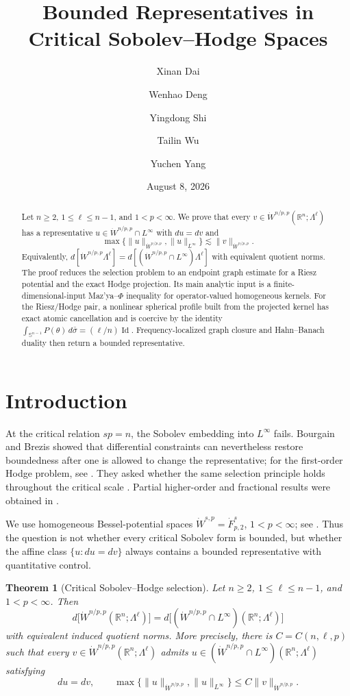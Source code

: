 \documentclass[11pt]{amsart}
\title{Bounded Representatives in Critical Sobolev--Hodge Spaces}
\author{Xinan Dai}
\author{Wenhao Deng}
\author{Yingdong Shi}
\author{Tailin Wu}
\author{Yuchen Yang}
\date{August 8, 2026}
\numberwithin{equation}{section}
\newtheorem{theorem}{Theorem}[section]
\theoremstyle{definition}
\theoremstyle{remark}
\newcommand{\R}{\mathbb R}
\newcommand{\Sph}{\mathbb S}
\newcommand{\Id}{\operatorname{Id}}
\newcommand{\norm}[1]{\lVert #1\rVert}
\begin{document}
\begin{abstract}
Let $n\ge2$, $1\le \ell\le n-1$, and $1<p<\infty$.  We prove that every
$v\in\dot W^{n/p,p}(\R^n;\Lambda^\ell)$ has a representative
$u\in\dot W^{n/p,p}\cap L^\infty$ with $du=dv$ and
\[
 \max\{\norm u_{\dot W^{n/p,p}},\norm u_{L^\infty}\}
 \lesssim \norm v_{\dot W^{n/p,p}}.
\]
Equivalently,
$d[\dot W^{n/p,p}\Lambda^\ell]
=d[(\dot W^{n/p,p}\cap L^\infty)\Lambda^\ell]$
with equivalent quotient norms.  The proof reduces the selection problem to
an endpoint graph estimate for a Riesz potential and the exact Hodge
projection.  Its main analytic input is a finite-dimensional-input
Maz'ya--$\Phi$ inequality for operator-valued homogeneous kernels.  For the
Riesz/Hodge pair, a nonlinear spherical profile built from the projected
kernel has exact atomic cancellation and is coercive by the identity
$\int_{\Sph^{n-1}}P(\theta)\,d\bar\sigma=(\ell/n)\Id$.  Frequency-localized
graph closure and Hahn--Banach duality then return a bounded representative.
\end{abstract}

\maketitle

\section{Introduction}

At the critical relation $sp=n$, the Sobolev embedding into $L^\infty$
fails.  Bourgain and Brezis showed that differential constraints can
nevertheless restore boundedness after one is allowed to change the
representative; for the first-order Hodge problem, see
\cite{BB03,BB04,BB07}.  They asked whether the same selection principle holds
throughout the critical scale \cite[p.~297, Open Problem~2]{BB07}.  Partial
higher-order and fractional results were obtained in \cite{BRWY19}.

We use homogeneous Bessel-potential spaces
$\dot W^{s,p}=\dot F^s_{p,2}$, $1<p<\infty$; see
\cite[Chapter~2]{Triebel83}.  Thus the question is not whether every critical
Sobolev form is bounded, but whether the affine class
$\{u:du=dv\}$ always contains a bounded representative with quantitative
control.

\begin{theorem}[Critical Sobolev--Hodge selection]\label{thm:main}
Let $n\ge2$, $1\le \ell\le n-1$, and $1<p<\infty$.  Then
\begin{equation}\label{eq:main-image}
 d\bigl[\dot W^{n/p,p}(\R^n;\Lambda^\ell)\bigr]
 =d\bigl[(\dot W^{n/p,p}\cap L^\infty)(\R^n;\Lambda^\ell)\bigr]
\end{equation}
with equivalent induced quotient norms.  More precisely, there is
$C=C(n,\ell,p)$ such that every
$v\in\dot W^{n/p,p}(\R^n;\Lambda^\ell)$ admits
$u\in(\dot W^{n/p,p}\cap L^\infty)(\R^n;\Lambda^\ell)$ satisfying
\begin{equation}\label{eq:main-estimate}
 du=dv,\qquad
 \max\bigl\{\norm{u}_{\dot W^{n/p,p}},\norm{u}_{L^\infty}\bigr\}
 \le C\norm{v}_{\dot W^{n/p,p}}.
\end{equation}
\end{theorem}
\end{document}

